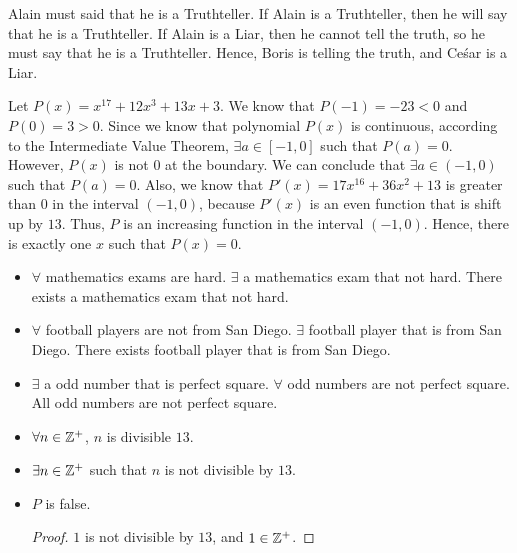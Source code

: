 \documentclass[8pt,twocolumn]{article}
\begin{document}
\begin{Answer}[number=2.2.14]
  Alain must said that he is a Truthteller. If Alain is a Truthteller, then
  he will say that he is a Truthteller. If Alain is a Liar, then he cannot
  tell the truth, so he must say that he is a Truthteller. Hence, Boris is
  telling the truth, and Ce\'sar is a Liar.
\end{Answer}

\begin{Answer}[number=2.2.18]
  Let $P(x) = x^{17}+12x^3+13x+3$. We know that $P(-1)=-23<0$ and $P(0)=3>0$.
  Since we know that polynomial $P(x)$ is continuous, according to the
  Intermediate Value Theorem, $\exists a \in [-1,0]$ such that $P(a) = 0$.
  However, $P(x)$ is not $0$ at the boundary. We can conclude that $\exists a
  \in (-1,0)$ such that $P(a) = 0$. Also, we know that $P'(x) = 17x^{16} +
  36x^2+13$ is greater than $0$ in the interval $(-1,0)$, because $P'(x)$ is an
  even function that is shift up by $13$. Thus, $P$ is an increasing function in
  the interval $(-1,0)$. Hence, there is exactly one $x$ such that $P(x)=0$.
\end{Answer}

\begin{Answer}[number=2.3.1]
  \begin{itemize}
    \item $\forall$ mathematics exams are hard. $\exists$ a mathematics exam
      that not hard. There exists a mathematics exam that not hard.
    \item $\forall$ football players are not from San Diego. $\exists$ football
      player that is from San Diego. There exists football player that is from
      San Diego.
    \item $\exists$ a odd number that is perfect square. $\forall$ odd numbers
      are not perfect square. All odd numbers are not perfect square.
  \end{itemize}
\end{Answer}

\begin{Answer}[number=2.3.2]
  \begin{itemize}
    \item $\forall n \in \mathbb{Z}^+$, $n$ is divisible $13$.
    \item $\exists n \in \mathbb{Z}^+$ such that $n$ is not divisible by $13$.
    \item $P$ is false.
      \begin{proof}
        $1$ is not divisible by $13$, and $1\in\mathbb{Z}^+$.
      \end{proof}
  \end{itemize}
\end{Answer}
\end{document}
